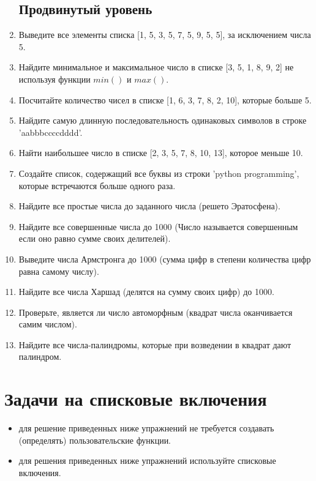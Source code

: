 \documentclass[a4,12pt]{article}
\theoremstyle{remark}
\begin{document}
\begin{enumerate}
    \subsection*{Продвинутый уровень}
    \item Выведите все элементы списка [1, 5, 3, 5, 7, 5, 9, 5, 5], за исключением числа 5.
    \item Найдите минимальное и максимальное число в списке [3, 5, 1, 8, 9, 2] не используя функции $min()$ и $max()$.
    \item Посчитайте количество чисел в списке [1, 6, 3, 7, 8, 2, 10], которые больше 5.
    \item Найдите самую длинную последовательность одинаковых символов в строке 'aabbbccccdddd'.
    \item Найти наибольшее число в списке [2, 3, 5, 7, 8, 10, 13], которое меньше 10.
    
    \item Создайте список, содержащий все буквы из строки 'python programming', которые встречаются больше одного раза.
    \item Найдите все простые числа до заданного числа (решето Эратосфена).
    \item Найдите все совершенные числа до 1000 (Число называется совершенным если оно равно сумме своих делителей).
    \item Выведите числа Армстронга до 1000 (сумма цифр в степени количества цифр равна самому числу).
    \item Найдите все числа Харшад (делятся на сумму своих цифр) до 1000.
    \item Проверьте, является ли число автоморфным (квадрат числа оканчивается самим числом).
    \item Найдите все числа-палиндромы, которые при возведении в квадрат дают палиндром.

\end{enumerate}

\newpage

\section*{\centering Задачи на списковые включения}

\begin{exercisenote}[title=Замечания]
    \begin{itemize}
        \item для решение приведенных ниже упражнений не требуется создавать (определять) пользовательские функции.
        \item для решения приведенных ниже упражнений используйте списковые включения.
    \end{itemize}
\end{exercisenote}
\end{document}
